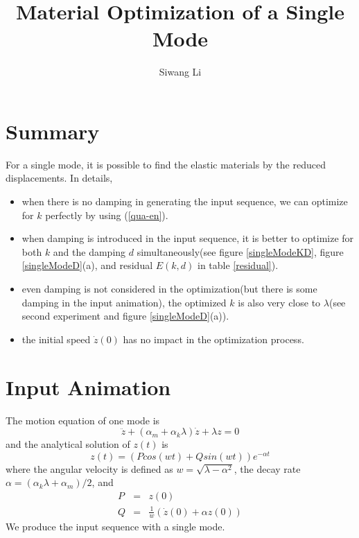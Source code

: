 \documentclass[twocolumn,a4paper]{article}
\author{Siwang Li}
\title{Material Optimization of a Single Mode}
\begin{document}
\maketitle

\section{Summary}
For a single mode, it is possible to find the elastic materials by the reduced
displacements. In details, 
\begin{itemize}
\item when there is no damping in generating the input sequence, we
can optimize for $k$ perfectly by using (\ref{qua-en}).
\item when damping is introduced in the input sequence, it is better to optimize
  for both $k$ and the damping $d$ simultaneously(see figure \ref{singleModeKD},
  figure \ref{singleModeD}(a), and residual $E(k,d)$ in table \ref{residual}).
\item even damping is not considered in the optimization(but there is some
  damping in the input animation), the optimized $k$ is also very close to
  $\lambda$(see second experiment and figure \ref{singleModeD}(a)).
\item the initial speed $\dot{z}(0)$ has no impact in the optimization process.
\end{itemize}

\section{Input Animation}
The motion equation of one mode is
\begin{equation} \label{deeq}
  \ddot{z} + (\alpha_m+\alpha_k\lambda)\dot{z} + \lambda z = 0
\end{equation}
and the analytical solution of $z(t)$ is
\begin{equation} \label{oss}
  z(t) = (Pcos(wt) + Qsin(wt))e^{-\alpha t}
\end{equation}
where the angular velocity is defined as $w = \sqrt{\lambda-\alpha^2}$, the
decay rate $\alpha = (\alpha_k\lambda+\alpha_m)/2$, and
\begin{eqnarray}\label{PQ}
  P &=& z(0) \\
  Q &=& \frac{1}{w}(\dot{z}(0) + \alpha z(0))
\end{eqnarray}
We produce the input sequence with a single mode.
\end{document}
